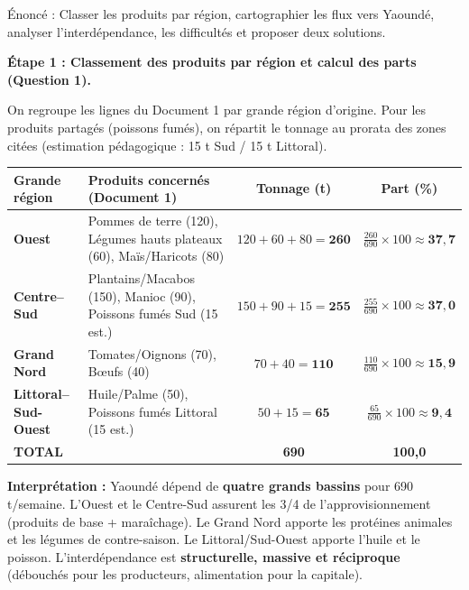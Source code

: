 \documentclass[11pt]{article}
\begin{document}
\begin{exoresolu}
Énoncé : Classer les produits par région, cartographier les flux vers Yaoundé, analyser l'interdépendance, les difficultés et proposer deux solutions.
\tcblower

\textbf{Étape 1 : Classement des produits par région et calcul des parts (Question 1).}\par
On regroupe les lignes du Document 1 par grande région d'origine. Pour les produits partagés (poissons fumés), on répartit le tonnage au prorata des zones citées (estimation pédagogique : 15 t Sud / 15 t Littoral).

\begin{center}
\begin{tabularx}{\linewidth}{|l|X|c|c|}
\hline
\rowcolor{popblueL} \textbf{Grande région} & \textbf{Produits concernés (Document 1)} & \textbf{Tonnage (t)} & \textbf{Part (\%)} \\
\hline
\textbf{Ouest} & Pommes de terre (120), Légumes hauts plateaux (60), Maïs/Haricots (80) & $120+60+80 = \mathbf{260}$ & $\frac{260}{690}\times100 \approx \mathbf{37,7}$ \\
\hline
\textbf{Centre--Sud} & Plantains/Macabos (150), Manioc (90), Poissons fumés Sud (15 est.) & $150+90+15 = \mathbf{255}$ & $\frac{255}{690}\times100 \approx \mathbf{37,0}$ \\
\hline
\textbf{Grand Nord} & Tomates/Oignons (70), Bœufs (40) & $70+40 = \mathbf{110}$ & $\frac{110}{690}\times100 \approx \mathbf{15,9}$ \\
\hline
\textbf{Littoral--Sud-Ouest} & Huile/Palme (50), Poissons fumés Littoral (15 est.) & $50+15 = \mathbf{65}$ & $\frac{65}{690}\times100 \approx \mathbf{9,4}$ \\
\hline
\textbf{TOTAL} & & \textbf{690} & \textbf{100,0} \\
\hline
\end{tabularx}
\end{center}

\textbf{Interprétation :} Yaoundé dépend de \textbf{quatre grands bassins} pour 690 t/semaine. L'Ouest et le Centre-Sud assurent les 3/4 de l'approvisionnement (produits de base + maraîchage). Le Grand Nord apporte les protéines animales et les légumes de contre-saison. Le Littoral/Sud-Ouest apporte l'huile et le poisson. L'interdépendance est \textbf{structurelle, massive et réciproque} (débouchés pour les producteurs, alimentation pour la capitale).


\end{exoresolu}
\end{document}
